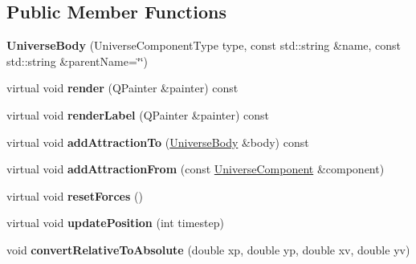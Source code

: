 \subsection*{Public Member Functions}
\begin{DoxyCompactItemize}
\item 
{\bfseries Universe\+Body} (Universe\+Component\+Type type, const std\+::string \&name, const std\+::string \&parent\+Name=\char`\"{}\char`\"{})\hypertarget{classUniverseBody_a495e1daf0ebb87f016a4240a9c1e1808}{}\label{classUniverseBody_a495e1daf0ebb87f016a4240a9c1e1808}

\item 
virtual void {\bfseries render} (Q\+Painter \&painter) const\hypertarget{classUniverseBody_a70e698b61bea240d49eb8e7ab8b3adcc}{}\label{classUniverseBody_a70e698b61bea240d49eb8e7ab8b3adcc}

\item 
virtual void {\bfseries render\+Label} (Q\+Painter \&painter) const\hypertarget{classUniverseBody_ac715dabc3f3ad74885eab48641f48349}{}\label{classUniverseBody_ac715dabc3f3ad74885eab48641f48349}

\item 
virtual void {\bfseries add\+Attraction\+To} (\hyperlink{classUniverseBody}{Universe\+Body} \&body) const\hypertarget{classUniverseBody_a75be4fe3635ad3fabd32a91e1529d91a}{}\label{classUniverseBody_a75be4fe3635ad3fabd32a91e1529d91a}

\item 
virtual void {\bfseries add\+Attraction\+From} (const \hyperlink{classUniverseComponent}{Universe\+Component} \&component)\hypertarget{classUniverseBody_a1e02b10cac430619e38ed85693e5445b}{}\label{classUniverseBody_a1e02b10cac430619e38ed85693e5445b}

\item 
virtual void {\bfseries reset\+Forces} ()\hypertarget{classUniverseBody_a284d6976b43911bfdb58e86beabb5c46}{}\label{classUniverseBody_a284d6976b43911bfdb58e86beabb5c46}

\item 
virtual void {\bfseries update\+Position} (int timestep)\hypertarget{classUniverseBody_a5a0ed5719f40137bc0ed135fee91de8e}{}\label{classUniverseBody_a5a0ed5719f40137bc0ed135fee91de8e}

\item 
void {\bfseries convert\+Relative\+To\+Absolute} (double xp, double yp, double xv, double yv)\hypertarget{classUniverseBody_a3d63022b51f35c24d016700921c50841}{}\label{classUniverseBody_a3d63022b51f35c24d016700921c50841}


\end{DoxyCompactItemize}
